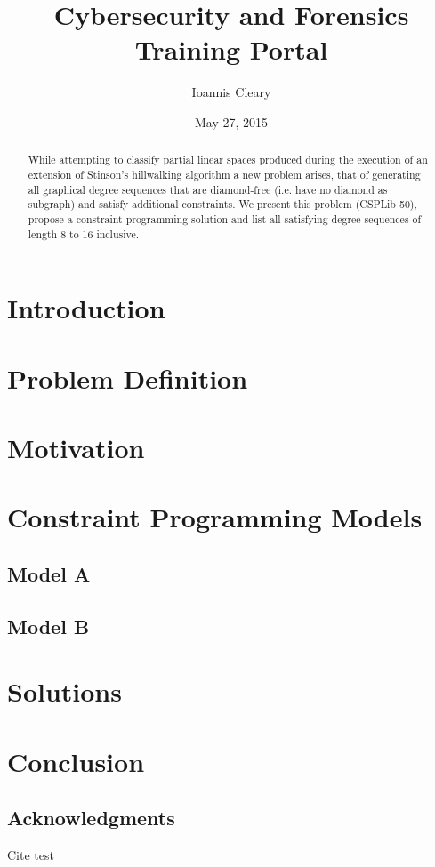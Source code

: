 \documentclass{l4proj}
\begin{document}
\title{Cybersecurity and Forensics Training Portal}
\author{Ioannis Cleary}
\date{May 27, 2015}
\maketitle

\begin{abstract}
While attempting to classify partial linear spaces produced during the execution of an
extension of Stinson's hillwalking algorithm a new problem arises, that of generating all graphical degree sequences 
that are diamond-free (i.e. have no diamond as subgraph) and satisfy additional constraints.  
We present this problem (CSPLib 50), propose a constraint programming solution and list all
satisfying degree sequences of length 8 to 16 inclusive.
\end{abstract}

\chapter{Introduction}
\label{sec:intro}
\vspace{-3mm}


\chapter{Problem Definition}
\label{sec:probDefn}
\vspace{-3mm}


\chapter{Motivation}
\label{sec:motivation}
\vspace{-3mm}

\chapter{Constraint Programming Models}
\label{sec:models}
\vspace{-3mm}

\section{Model A}
\vspace{-3mm}

\section{Model B}
\vspace{-3mm}


\chapter{Solutions}
\label{sec:solutions}
\vspace{-3mm}


\chapter{Conclusion}
\label{sec:conc}
\vspace{-3mm}


\section*{Acknowledgments}
\label{sec:ack}
\vspace{-3mm}
Cite test \cite{CSPLib}



\end{document}
